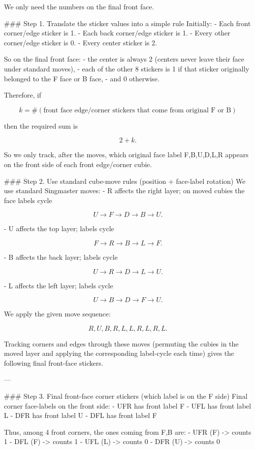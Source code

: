 We only need the numbers on the final front face.

### Step 1. Translate the sticker values into a simple rule
Initially:
- Each front corner/edge sticker is 1.
- Each back corner/edge sticker is 1.
- Every other corner/edge sticker is 0.
- Every center sticker is 2.

So on the final front face:
- the center is always 2 (centers never leave their face under standard moves),
- each of the other 8 stickers is 1 if that sticker originally belonged to the F face or B face,
- and 0 otherwise.

Therefore, if

$$
k = \#(\text{front face edge/corner stickers that come from original F or B})
$$

then the required sum is

$$
2+k.
$$

So we only track, after the moves, which original face label F,B,U,D,L,R appears on the front side of each front edge/corner cubie.

### Step 2. Use standard cube-move rules (position + face-label rotation)
We use standard Singmaster moves:
- R affects the right layer; on moved cubies the face labels cycle

$$
U \to F \to D \to B \to U.
$$

- U affects the top layer; labels cycle

$$
F \to R \to B \to L \to F.
$$

- B affects the back layer; labels cycle

$$
U \to R \to D \to L \to U.
$$

- L affects the left layer; labels cycle

$$
U \to B \to D \to F \to U.
$$

We apply the given move sequence:

$$
R, U, B, R, L, L, R, L, R, L.
$$

Tracking corners and edges through these moves (permuting the cubies in the moved layer and applying the corresponding label-cycle each time) gives the following final front-face stickers.

---

### Step 3. Final front-face corner stickers (which label is on the F side)
Final corner face-labels on the front side:
- UFR has front label F
- UFL has front label L
- DFR has front label U
- DFL has front label F

Thus, among 4 front corners, the ones coming from {F,B} are:
- UFR (F) -> counts 1
- DFL (F) -> counts 1
- UFL (L) -> counts 0
- DFR (U) -> counts 0

